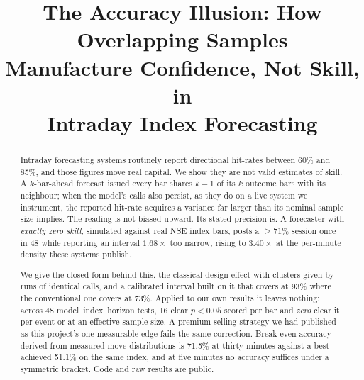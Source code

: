 \documentclass[conference]{IEEEtran}
\begin{document}
\title{The Accuracy Illusion: How Overlapping Samples\\
Manufacture Confidence, Not Skill, in\\
Intraday Index Forecasting}

\author{
\and
{}
}

\maketitle

\begin{abstract}
Intraday forecasting systems routinely report directional hit-rates between
60\% and 85\%, and those figures move real capital. We show they are not valid
estimates of skill. A $k$-bar-ahead forecast issued every bar shares $k{-}1$ of
its $k$ outcome bars with its neighbour; when the model's calls also persist, as
they do on a live system we instrument, the reported hit-rate acquires a
variance far larger than its nominal sample size implies. The reading is not
biased upward. Its stated precision is. A forecaster with \emph{exactly zero
skill}, simulated against real NSE index bars, posts a $\geq$71\% session once
in 48 while reporting an interval $1.68\times$ too narrow, rising to
$3.40\times$ at the per-minute density these systems publish.

We give the closed form behind this, the classical design effect with clusters
given by runs of identical calls, and a calibrated interval built on it that
covers at 93\% where the conventional one covers at 73\%. Applied to our own
results it leaves nothing: across 48 model--index--horizon tests, 16 clear
$p<0.05$ scored per bar and \emph{zero} clear it per event or at an effective
sample size. A premium-selling strategy we had published as this project's one
measurable edge fails the same correction. Break-even accuracy derived from
measured move distributions is 71.5\% at thirty minutes against a best achieved
51.1\% on the same index, and at five minutes no accuracy suffices under a symmetric bracket. Code
and raw results are public.
\end{abstract}
\end{document}
